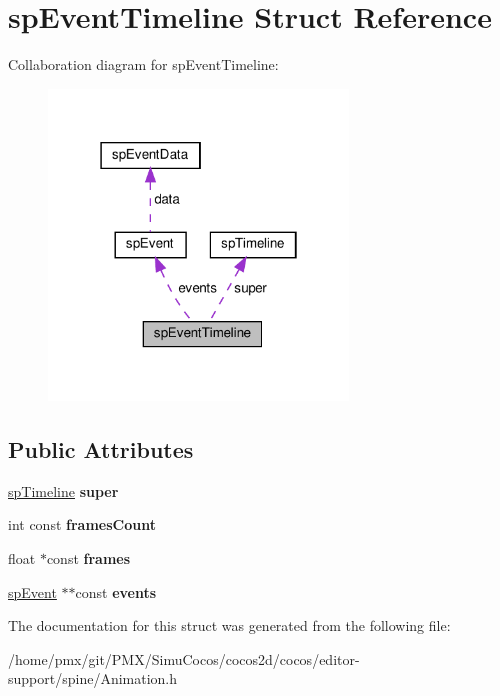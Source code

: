 \hypertarget{structspEventTimeline}{}\section{sp\+Event\+Timeline Struct Reference}
\label{structspEventTimeline}


Collaboration diagram for sp\+Event\+Timeline\+:
\nopagebreak
\begin{figure}[H]
\begin{center}
\leavevmode
\includegraphics[width=226pt]{structspEventTimeline__coll__graph}
\end{center}
\end{figure}
\subsection*{Public Attributes}
\begin{DoxyCompactItemize}
\item 
\mbox{\label{structspEventTimeline_a9c2ff1e6dc96afb0d3f572142eebecb2}} 
\hyperlink{structspTimeline}{sp\+Timeline} {\bfseries super}
\item 
\mbox{\label{structspEventTimeline_a0d54345db37cee6ddd52e4b4ce269c6c}} 
int const {\bfseries frames\+Count}
\item 
\mbox{\label{structspEventTimeline_ab563ae6f333b7ae36e1f4647abf59875}} 
float $\ast$const {\bfseries frames}
\item 
\mbox{\label{structspEventTimeline_af6347c1a3fddef4663273ce670b8b4ad}} 
\hyperlink{structspEvent}{sp\+Event} $\ast$$\ast$const {\bfseries events}
\end{DoxyCompactItemize}


The documentation for this struct was generated from the following file\+:\begin{DoxyCompactItemize}
\item 
/home/pmx/git/\+P\+M\+X/\+Simu\+Cocos/cocos2d/cocos/editor-\/support/spine/Animation.\+h\end{DoxyCompactItemize}
